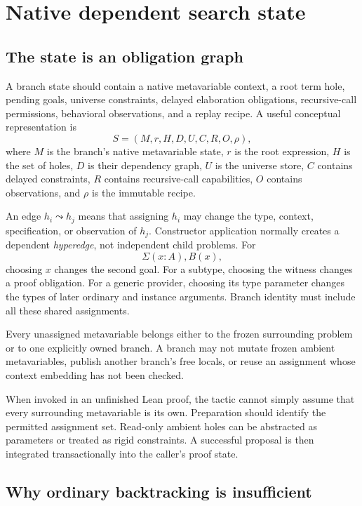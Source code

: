 \section{Native dependent search state}
\label{sec:state}

\subsection{The state is an obligation graph}

A branch state should contain a native metavariable context, a root term hole, pending goals, universe constraints, delayed elaboration obligations, recursive-call permissions, behavioral observations, and a replay recipe. A useful conceptual representation is
\[
 S=(M,r,H,D,U,C,R,O,\rho),
\]
where $M$ is the branch's native metavariable state, $r$ is the root expression, $H$ is the set of holes, $D$ is their dependency graph, $U$ is the universe store, $C$ contains delayed constraints, $R$ contains recursive-call capabilities, $O$ contains observations, and $\rho$ is the immutable recipe.

An edge $h_i\leadsto h_j$ means that assigning $h_i$ may change the type, context, specification, or observation of $h_j$. Constructor application normally creates a dependent \emph{hyperedge}, not independent child problems. For
\[
 \Sigma (x:A), B(x),
\]
choosing $x$ changes the second goal. For a subtype, choosing the witness changes a proof obligation. For a generic provider, choosing its type parameter changes the types of later ordinary and instance arguments. Branch identity must include all these shared assignments.

\begin{invariant}
Every unassigned metavariable belongs either to the frozen surrounding problem or to one explicitly owned branch. A branch may not mutate frozen ambient metavariables, publish another branch's free locals, or reuse an assignment whose context embedding has not been checked.
\end{invariant}

When invoked in an unfinished Lean proof, the tactic cannot simply assume that every surrounding metavariable is its own. Preparation should identify the permitted assignment set. Read-only ambient holes can be abstracted as parameters or treated as rigid constraints. A successful proposal is then integrated transactionally into the caller's proof state.

\subsection{Why ordinary backtracking is insufficient}

